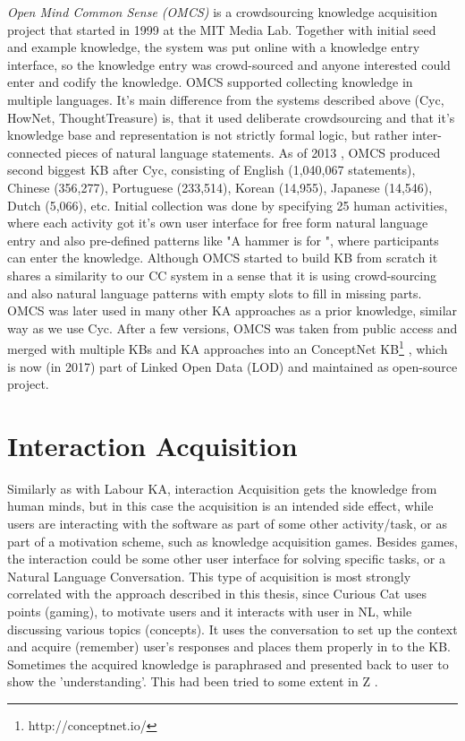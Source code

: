 \emph{Open Mind Common Sense (OMCS)} is a crowdsourcing knowledge acquisition project that started in 1999 at the MIT Media Lab. Together with initial seed and example knowledge, the system was put online with a knowledge entry interface, so the knowledge entry was crowd-sourced and anyone interested could enter and codify the knowledge. OMCS supported collecting knowledge in multiple languages. It's main difference from the systems described above (Cyc, HowNet, ThoughtTreasure) is, that it used deliberate crowdsourcing and that it's knowledge base and representation is not strictly formal logic, but rather inter-connected pieces of natural language statements. As of 2013 \parencite{Zang2013}, OMCS produced second biggest KB after Cyc, consisting of English (1,040,067 statements), Chinese (356,277), Portuguese (233,514), Korean (14,955), Japanese (14,546), Dutch (5,066), etc. Initial collection was done by specifying 25 human activities, where each activity got it's own user interface for free form natural language entry and also pre-defined patterns like "A hammer is for \underline{\hspace{1.5cm}}", where participants can enter the knowledge. Although OMCS started to build KB from scratch it shares a similarity to our CC system in a sense that it is using crowd-sourcing and also natural language patterns with empty slots to fill in missing parts. OMCS was later used in many other KA approaches as a prior knowledge, similar way as we use Cyc. After a few versions, OMCS was taken from public access and merged with multiple KBs and KA approaches into an ConceptNet KB\footnote{http://conceptnet.io/} \parencite{Speer2016}, which is now (in 2017) part of Linked Open Data (LOD) and maintained as open-source project.
 
\section{Interaction Acquisition}
Similarly as with Labour KA, interaction Acquisition gets the knowledge from human minds, but in this case the acquisition is an intended side effect, while users are interacting with the software as part of some other activity/task, or as part of a motivation scheme, such as knowledge acquisition games. Besides games, the interaction could be some other user interface for solving specific tasks, or a Natural Language Conversation. This type of acquisition is most strongly correlated with the approach described in this thesis, since Curious Cat uses points (gaming), to motivate users and it interacts with user in NL, while discussing various topics (concepts). It uses the conversation to set up the context and acquire (remember) user's responses and places them properly in to the KB. Sometimes the acquired knowledge is paraphrased and presented back to user to show the 'understanding'. This had been tried to some extent in Z \parencite{Singh2002b}.
 


